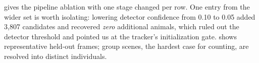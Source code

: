  gives the pipeline ablation with one stage changed per row. One entry
from the wider set is worth isolating: lowering detector confidence from 0.10 to 0.05 added
3,807 candidates and recovered \emph{zero} additional animals, which ruled out the detector
threshold and pointed us at the tracker's initialization gate.  shows
representative held-out frames; group scenes, the hardest case for counting, are resolved
into distinct individuals.
